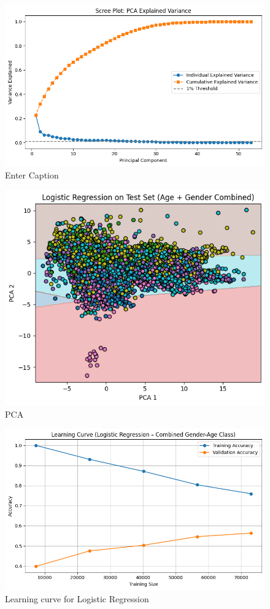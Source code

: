\documentclass[10pt,twocolumn]{article}
\begin{document}
\begin{figure}[H]
    \centering
    \includegraphics[width=1\linewidth]{images/lr/scree_plot.png}
    \caption{Enter Caption}
    \label{fig:pca-scree}
\end{figure}

\begin{figure}[H]
    \centering
    \includegraphics[width=1\linewidth]{images/lr/pca.png}
    \caption{PCA}
    \label{fig:PCA}
\end{figure}
\begin{figure}[H]
    \centering
    \includegraphics[width=1\linewidth]{images/lr/cross-validation - normal.png}
    \caption{Learning curve for Logistic Regression}
    \label{fig:reduced-learning-curve}
\end{figure}
\end{document}
